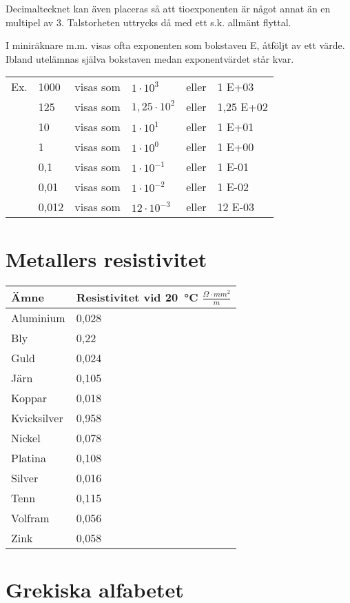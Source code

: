 Decimaltecknet kan även placeras så att tioexponenten är något annat
än en multipel av 3. Talstorheten uttrycks då med ett s.k. allmänt
flyttal.

I miniräknare m.m. visas ofta exponenten som bokstaven E, åtföljt av
ett värde. Ibland utelämnas själva bokstaven medan exponentvärdet står
kvar.

\begin{tabular}{llllll}
  Ex. & 1000  & visas som & \(1    \cdot 10^3  \) & eller & 1 E+03 \\
      & 125   & visas som & \(1,25 \cdot 10^2  \) & eller & 1,25 E+02 \\
      & 10    & visas som & \(1    \cdot 10^1  \) & eller & 1 E+01 \\
      & 1     & visas som & \(1    \cdot 10^0  \) & eller & 1 E+00 \\
      & 0,1   & visas som & \(1    \cdot 10^{-1}\) & eller & 1 E-01 \\
      & 0,01  & visas som & \(1    \cdot 10^{-2}\) & eller & 1 E-02 \\
      & 0,012 & visas som & \(12   \cdot 10^{-3}\) & eller & 12 E-03 \\
\end{tabular}

\section{Metallers resistivitet}

\begin{tabular}{l|l}
  Ämne & Resistivitet vid 20~°C \(\frac{\Omega\cdot mm^2}{m}\) \\
  \hline
  Aluminium   & 0,028 \\
  Bly         & 0,22  \\
  Guld        & 0,024 \\
  Järn        & 0,105 \\
  Koppar      & 0,018 \\
  Kvicksilver & 0,958 \\
  Nickel      & 0,078 \\
  Platina     & 0,108 \\
  Silver      & 0,016 \\
  Tenn        & 0,115 \\
  Volfram     & 0,056 \\
  Zink        & 0,058 \\
\end{tabular}


\section{Grekiska alfabetet}

